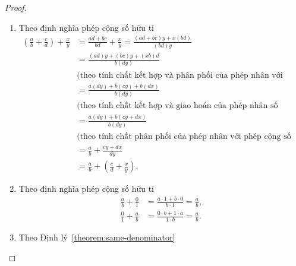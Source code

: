 \begin{proof}
    \begin{enumerate}[label={(\roman*)}]
        \item Theo định nghĩa phép cộng số hữu tỉ
              \begin{align*}
                  \left(\frac{a}{b} + \frac{c}{d}\right) + \frac{x}{y} & = \frac{a d + b c}{b d} + \frac{x}{y} = \frac{(a d + b c) y + x (b d)}{(b d) y}    \\
                                                                       & = \frac{(a d) y + (b c) y +  (x b) d}{b (d y)}                                     \\
                                                                       & \text{(theo tính chất kết hợp và phân phối của phép nhân với phép cộng số nguyên)} \\
                                                                       & = \frac{a (d y) + b (c y) + b(dx)}{b (d y)}                                        \\
                                                                       & \text{(theo tính chất kết hợp và giao hoán của phép nhân số nguyên)}               \\
                                                                       & = \frac{a (d y) + b (c y + dx)}{b (d y)}                                           \\
                                                                       & \text{(theo tính chất phân phối của phép nhân với phép cộng số nguyên)}            \\
                                                                       & = \frac{a}{b} + \frac{c y + dx}{d y}                                               \\
                                                                       & = \frac{a}{b} + \left(\frac{c}{d} + \frac{x}{y}\right).
              \end{align*}
        \item Theo định nghĩa phép cộng số hữu tỉ
              \begin{align*}
                  \frac{a}{b} + \frac{0}{1} & = \frac{a\cdot 1 + b\cdot 0}{b\cdot 1} = \frac{a}{b}, \\
                  \frac{0}{1} + \frac{a}{b} & = \frac{0\cdot b + 1\cdot a}{1\cdot b} = \frac{a}{b}.
              \end{align*}
        \item Theo Định lý~\ref{theorem:same-denominator}

\end{enumerate}
\end{proof}
